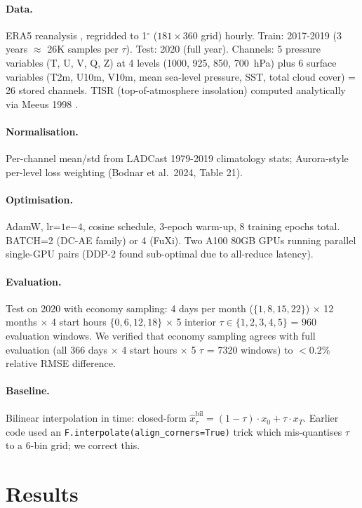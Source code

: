 \documentclass[10pt,letterpaper,twocolumn]{article}
\begin{document}
\paragraph{Data.} ERA5 reanalysis \cite{hersbach2020era5}, regridded to
1$^\circ$ ($181 \times 360$ grid) hourly. Train: 2017-2019 (3 years
$\approx$ 26K samples per $\tau$). Test: 2020 (full year). Channels: 5 pressure
variables (T, U, V, Q, Z) at 4 levels (1000, 925, 850, 700~hPa) plus 6
surface variables (T2m, U10m, V10m, mean sea-level pressure, SST, total
cloud cover) = 26 stored channels. TISR (top-of-atmosphere insolation)
computed analytically via Meeus 1998 \cite{meeus1998astronomical}.

\paragraph{Normalisation.} Per-channel mean/std from LADCast 1979-2019
climatology stats; Aurora-style per-level loss weighting (Bodnar et al.\
2024, Table 21).

\paragraph{Optimisation.} AdamW, lr=$1\mathrm{e}{-4}$, cosine schedule,
3-epoch warm-up, 8 training epochs total. BATCH=2 (DC-AE family) or 4 (FuXi).
Two A100 80GB GPUs running parallel single-GPU pairs (DDP-2 found
sub-optimal due to all-reduce latency).

\paragraph{Evaluation.} Test on 2020 with economy sampling: 4 days per month
($\{1, 8, 15, 22\}$) $\times$ 12 months $\times$ 4 start hours $\{0, 6, 12, 18\}$ $\times$ 5
interior $\tau \in \{1,2,3,4,5\}$ = 960 evaluation windows. We verified
that economy sampling agrees with full evaluation
(all 366 days $\times$ 4 start hours $\times$ 5 $\tau$ = 7320 windows) to $< 0.2\%$ relative
RMSE difference.

\paragraph{Baseline.} Bilinear interpolation in time: closed-form
$\hat{x}_\tau^\text{bil} = (1-\tau)\cdot x_0 + \tau \cdot x_T$. Earlier code
used an \texttt{F.interpolate(align\_corners=True)} trick which mis-quantises
$\tau$ to a 6-bin grid; we correct this.

\section{Results}
\label{sec:results}
\end{document}
